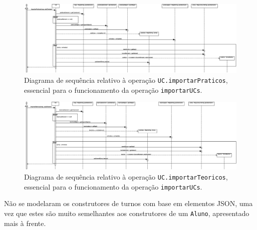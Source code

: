 \documentclass[12pt, a4paper]{article}
\begin{document}
\begin{landscape}
        \vspace*{\fill}
        \pagebreak
        \vspace*{\fill}

        \begin{figure}[H]
            \centering
            \includegraphics[scale=0.50]{Imagens/Modelos/importarUCsConstrutorUCimportarPraticosDAO.svg.eps}
            \caption{
                Diagrama de sequência relativo à operação \texttt{UC.importarPraticos}, essencial para o
                funcionamento da operação \texttt{importarUCs}.
            }
        \end{figure}

        \vspace*{\fill}
        \pagebreak
        \vspace*{\fill}

        \begin{figure}[H]
            \centering
            \includegraphics[scale=0.50]{Imagens/Modelos/importarUCsConstrutorUCimportarTeoricosDAO.svg.eps}
            \caption{
                Diagrama de sequência relativo à operação \texttt{UC.importarTeoricos}, essencial para o
                funcionamento da operação \texttt{importarUCs}.
            }
        \end{figure}

        Não se modelaram os construtores de turnos com base em elementos JSON, uma vez que estes são
        muito semelhantes aos construtores de um \texttt{Aluno}, apresentado mais à frente.

        \vspace*{\fill}
        \pagebreak
        \vspace*{\fill}


\end{landscape}
\end{document}
